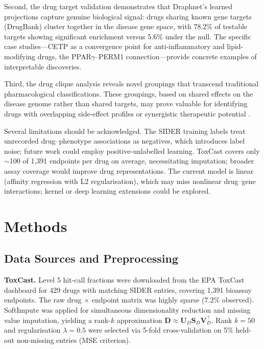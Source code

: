 \documentclass[11pt]{article}
\begin{document}
Second, the drug target validation demonstrates that Draphnet's learned projections capture genuine biological signal: drugs sharing known gene targets (DrugBank) cluster together in the disease gene space, with 78.2\% of testable targets showing significant enrichment versus 5.6\% under the null. The specific case studies---CETP as a convergence point for anti-inflammatory and lipid-modifying drugs, the PPAR$\gamma$--PERM1 connection---provide concrete examples of interpretable discoveries.

Third, the drug clique analysis reveals novel groupings that transcend traditional pharmacological classifications. These groupings, based on shared effects on the disease genome rather than shared targets, may prove valuable for identifying drugs with overlapping side-effect profiles or synergistic therapeutic potential \citep{cheng2019network}.

Several limitations should be acknowledged. The SIDER training labels treat unrecorded drug--phenotype associations as negatives, which introduces label noise; future work could employ positive-unlabelled learning. ToxCast covers only $\sim$100 of 1,391 endpoints per drug on average, necessitating imputation; broader assay coverage would improve drug representations. The current model is linear (affinity regression with L2 regularisation), which may miss nonlinear drug--gene interactions; kernel or deep learning extensions could be explored.

\section{Methods}

\subsection{Data Sources and Preprocessing}

\textbf{ToxCast.} Level 5 hit-call fractions were downloaded from the EPA ToxCast dashboard \citep{richard2016toxcast} for 429 drugs with matching SIDER entries, covering 1,391 bioassay endpoints. The raw drug $\times$ endpoint matrix was highly sparse (7.2\% observed). SoftImpute \citep{mazumder2010spectral} was applied for simultaneous dimensionality reduction and missing value imputation, yielding a rank-$k$ approximation $\mathbf{D} \approx \mathbf{U}_D \mathbf{S}_D \mathbf{V}_D^\top$. Rank $k = 50$ and regularisation $\lambda = 0.5$ were selected via 5-fold cross-validation on 5\% held-out non-missing entries (MSE criterion).
\end{document}
